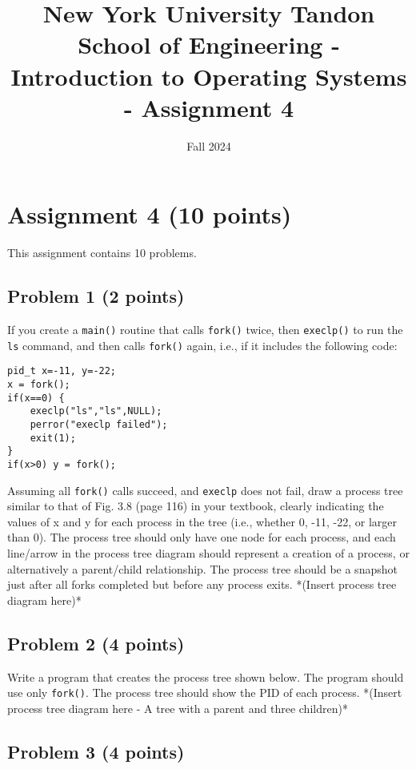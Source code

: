 \documentclass{article}
\title{New York University Tandon School of Engineering - Introduction to Operating Systems - Assignment 4}
\author{}
\date{Fall 2024}
\begin{document}
\maketitle

\section*{Assignment 4 (10 points)}

This assignment contains 10 problems.

\subsection*{Problem 1 (2 points)}

If you create a \texttt{main()} routine that calls \texttt{fork()} twice, then \texttt{execlp()} to run the \texttt{ls} command, and then calls \texttt{fork()} again, i.e., if it includes the following code:

\begin{verbatim}
pid_t x=-11, y=-22;
x = fork();
if(x==0) {
    execlp("ls","ls",NULL);
    perror("execlp failed");
    exit(1);
}
if(x>0) y = fork();
\end{verbatim}

Assuming all \texttt{fork()} calls succeed, and \texttt{execlp} does not fail, draw a process tree similar to that of Fig. 3.8 (page 116) in your textbook, clearly indicating the values of x and y for each process in the tree (i.e., whether 0, -11, -22, or larger than 0). The process tree should only have one node for each process, and each line/arrow in the process tree diagram should represent a creation of a process, or alternatively a parent/child relationship. The process tree should be a snapshot just after all forks completed but before any process exits. *(Insert process tree diagram here)*


\subsection*{Problem 2 (4 points)}

Write a program that creates the process tree shown below.  The program should use only \texttt{fork()}.  The process tree should show the PID of each process. *(Insert process tree diagram here -  A tree with a parent and three children)*


\subsection*{Problem 3 (4 points)}
\end{document}
